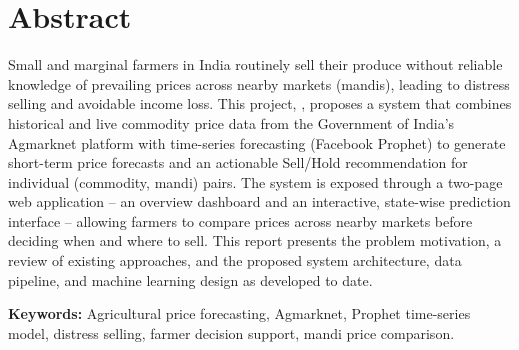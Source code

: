 \chapter*{Abstract}

Small and marginal farmers in India routinely sell their produce without
reliable knowledge of prevailing prices across nearby markets (mandis),
leading to distress selling and avoidable income loss. This project,
\textit{\ProjectTitle}, proposes a system that combines historical and
live commodity price data from the Government of India's Agmarknet
platform with time-series forecasting (Facebook Prophet) to generate
short-term price forecasts and an actionable Sell/Hold recommendation
for individual (commodity, mandi) pairs. The system is exposed through
a two-page web application -- an overview dashboard and an interactive,
state-wise prediction interface -- allowing farmers to compare prices
across nearby markets before deciding when and where to sell. This
report presents the problem motivation, a review of existing approaches,
and the proposed system architecture, data pipeline, and machine
learning design as developed to date.

\vspace{1cm}
\noindent\textbf{Keywords:} Agricultural price forecasting, Agmarknet,
Prophet time-series model, distress selling, farmer decision support,
mandi price comparison.
